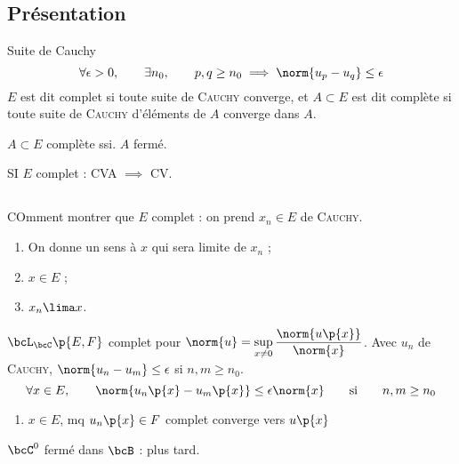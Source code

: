 \documentclass[a4paper,french,bookmarks]{book}
\begin{document}
    \subsection{Présentation}

    \begin{definition}{Suite de Cauchy}{}
        \[ \forall \epsilon > 0,\qquad \exists n_0,\qquad p, q \geq n_0 \implies \norm{u_p - u_q} \leq \epsilon \]
        $E$ est dit complet si toute suite de \textsc{Cauchy} converge, et $A \subset E$ est dit complète si toute suite de \textsc{Cauchy} d'éléments de $A$ converge dans $A$.
    \end{definition}
    
    \begin{property}{}{}
        $A \subset E$ complète ssi. $A$ fermé.
    \end{property}
    
    
    SI $E$ complet : CVA $\implies$ CV.
    
    \subsection{}
    
    COmment montrer que $E$ complet : on prend $x_n \in E$ de \textsc{Cauchy}.
    
    \begin{enumerate}
        \item On donne un sens à $x$ qui sera limite de $x_n$ ;
        \item  $x \in E$ ;
        \item $x_n \lima x$.
    \end{enumerate}
        
        $\bcL_\bcC\p{E, F}$ complet pour $\norm{u} = \sup\limits_{x \neq 0} \dfrac{\norm{u\p{x}}}{\norm{x}}$. Avec $u_n$ de \textsc{Cauchy}, $\norm{u_n -u_m} \leq \epsilon$ si $n, m \geq n_0$.
        \[ \forall x \in E,\qquad \norm{u_n\p{x} - u_m\p{x}} \leq \epsilon\norm{x} \qquad\text{si}\qquad n, m \geq n_0\]
    
    \begin{enumerate}
        \item $x \in E$, mq $u_n\p{x} \in F$ complet converge vers $u\p{x}$
    \end{enumerate}
    
    $\bcC^0$ fermé dans $\bcB$ : plus tard.
    
\end{document}
